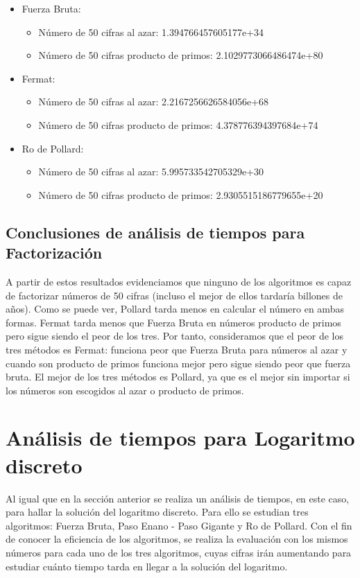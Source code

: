 \documentclass{article}
\begin{document}
    \begin{itemize}
        \item Fuerza Bruta:
        \begin{itemize}
            \item Número de 50 cifras al azar: 1.394766457605177e+34
            \item Número de 50 cifras producto de primos: 2.1029773066486474e+80
        \end{itemize}
        \item Fermat:
        \begin{itemize}
            \item Número de 50 cifras al azar: 2.2167256626584056e+68
            \item Número de 50 cifras producto de primos: 4.378776394397684e+74
        \end{itemize}
        \item Ro de Pollard:
        \begin{itemize}
            \item Número de 50 cifras al azar: 5.995733542705329e+30
            \item Número de 50 cifras producto de primos: 2.9305515186779655e+20
        \end{itemize}
    \end{itemize}

    \subsection*{Conclusiones de análisis de tiempos para Factorización}
    A partir de estos resultados evidenciamos que ninguno de los algoritmos es capaz de factorizar números de 50 cifras (incluso el mejor de ellos tardaría billones de años). Como se puede ver, Pollard tarda menos en calcular el número en ambas formas. Fermat tarda menos que Fuerza Bruta en números producto de primos pero sigue siendo el peor de los tres. Por tanto, consideramos que el peor de los tres métodos es Fermat: funciona peor que Fuerza Bruta para números al azar y cuando son producto de primos funciona mejor pero sigue siendo peor que fuerza bruta. El mejor de los tres métodos es Pollard, ya que es el mejor sin importar si los números son escogidos al azar o producto de primos.


    \newpage
    \section{Análisis de tiempos para Logaritmo discreto}
    Al igual que en la sección anterior se realiza un análisis de tiempos, en este caso, para hallar la solución del logaritmo discreto. Para ello se estudian tres algoritmos: Fuerza Bruta, Paso Enano - Paso Gigante y Ro de Pollard. 
    Con el fin de conocer la eficiencia de los algoritmos, se realiza la evaluación con los mismos números para cada uno de los tres algoritmos, cuyas cifras irán aumentando para estudiar cuánto tiempo tarda en llegar a la solución del logaritmo.
    
\end{document}
